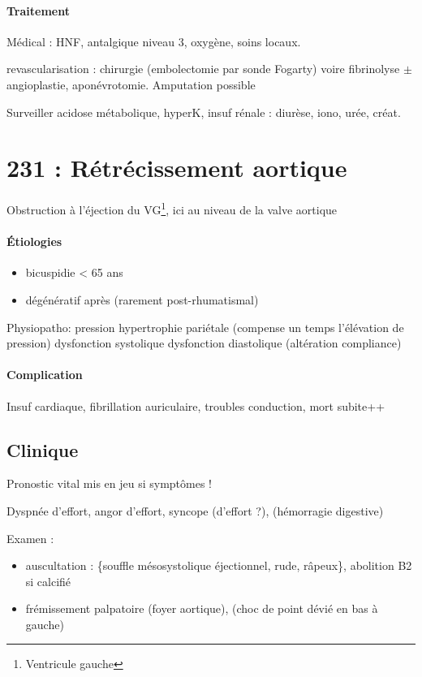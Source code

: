 \documentclass{article}
\begin{document}
\paragraph{Traitement}
Médical : HNF, antalgique niveau 3, oxygène, soins locaux.

revascularisation : chirurgie (embolectomie par sonde Fogarty) voire fibrinolyse
$\pm$ angioplastie, aponévrotomie. Amputation possible

Surveiller acidose métabolique, hyperK, insuf rénale : diurèse, iono, urée,
créat.

\section{231 : Rétrécissement aortique}%
\label{sec:231_retrecissement_aortique}
Obstruction à l'éjection du VG\footnote{Ventricule gauche}, ici au niveau de la
valve aortique

\paragraph{Étiologies} 
\begin{itemize}
  \item bicuspidie < 65 ans
  \item dégénératif après (rarement post-rhumatismal)
\end{itemize}

Physiopatho: \inc pression \thus hypertrophie pariétale (compense un temps
l'élévation de pression) \thus dysfonction systolique \thus dysfonction
diastolique (altération compliance)

\paragraph{Complication}
Insuf cardiaque, fibrillation auriculaire, troubles conduction, mort subite++

\subsection{Clinique}

Pronostic vital mis en jeu si symptômes ! \skull

Dyspnée d'effort, angor d'effort, syncope (d'effort ?), (hémorragie digestive)

Examen : 
\begin{itemize}
  \item auscultation : \{souffle mésosystolique éjectionnel, rude, râpeux\},
    abolition B2 si calcifié
  \item frémissement palpatoire (foyer aortique), (choc de point dévié en bas à
    gauche) 
\end{itemize}
\end{document}
